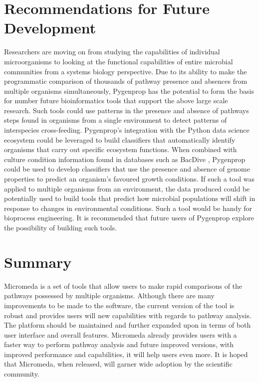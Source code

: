 \section{Recommendations for Future Development}

Researchers are moving on from studying the capabilities of individual microorganisms to looking at the functional capabilities of entire microbial communities from a systems biology perspective. Due to its ability to make the programmatic comparison of thousands of pathway presence and absences from multiple organisms simultaneously, Pygenprop has the potential to form the basis for number future bioinformatics tools that support the above large scale research. Such tools could use patterns in the presence and absence of pathways steps found in organisms from a single environment to detect patterns of interspecies cross-feeding. Pygenprop's integration with the Python data science ecosystem could be leveraged to build classifiers that automatically identify organisms that carry out specific ecosystem functions. When combined with culture condition information found in databases such as BacDive \cite{reimer2018bac}, Pygenprop could be used to develop classifiers that use the presence and absence of genome properties to predict an organism's favoured growth conditions. If such a tool was applied to multiple organisms from an environment, the data produced could be potentially used to build tools that predict how microbial populations will shift in response to changes in environmental conditions. Such a tool would be handy for bioprocess engineering. It is recommended that future users of Pygenprop explore the possibility of building such tools.

\section{Summary}

Micromeda is a set of tools that allow users to make rapid comparisons of the pathways possessed by multiple organisms. Although there are many improvements to be made to the software, the current version of the tool is robust and provides users will new capabilities with regards to pathway analysis. The platform should be maintained and further expanded upon in terms of both user interface and overall features. Micromeda already provides users with a faster way to perform pathway analysis and future improved versions, with improved performance and capabilities, it will help users even more. It is hoped that Micromeda, when released, will garner wide adoption by the scientific community.